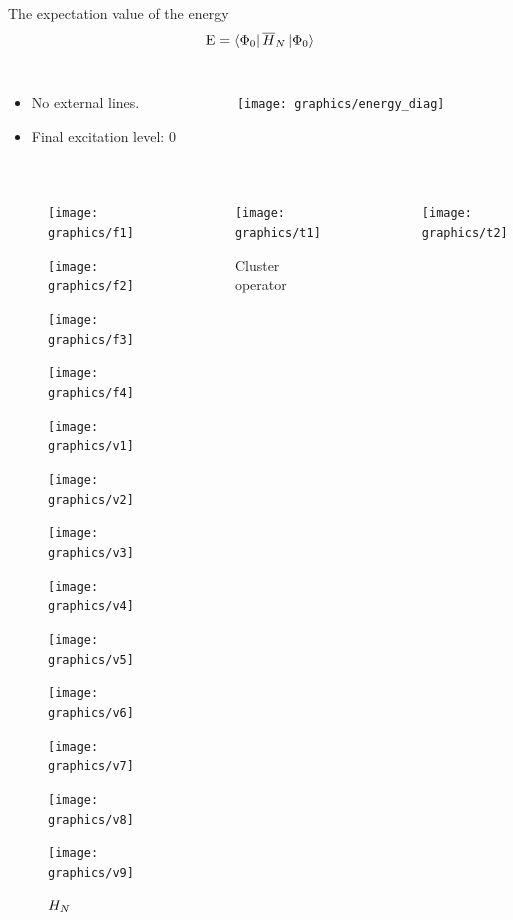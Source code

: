 \begin{frame}{The expectation value of the energy }
    \begin{equation*}
        \mathrm{E} = \bra{\Phi_0} \overline{H}_N \,|{\Phi_0}\rangle
    \end{equation*}
    \begin{columns}
    \begin{itemize}
        \item No external lines.
        \item Final excitation level: 0 
    \end{itemize}
    \begin{figure}
        \centering
        \texttt{[image: graphics/energy\_diag]}
    \end{figure}
    \end{columns}
    \renewcommand{\figurename}{Elements}
    \begin{columns}[t]
    \begin{figure}
        \caption{$H_N$}
        \centering
        \parbox{0.20\textwidth}{
            \centering
            \texttt{[image: graphics/f1]}} 
        \parbox{0.20\textwidth}{
            \centering
            \texttt{[image: graphics/f2]}} 
        \parbox{0.20\textwidth}{
            \centering
            \texttt{[image: graphics/f3]}} 
        \parbox{0.20\textwidth}{
            \centering
            \texttt{[image: graphics/f4]}} 
        \parbox{0.20\textwidth}{
            \centering
            \texttt{[image: graphics/v1]}} 
        \parbox{0.20\textwidth}{
            \centering
            \texttt{[image: graphics/v2]}} 
        \parbox{0.20\textwidth}{
            \centering
            \texttt{[image: graphics/v3]}} 
        \parbox{0.20\textwidth}{
            \centering
            \texttt{[image: graphics/v4]}} 
        \parbox{0.20\textwidth}{
            \centering
            \texttt{[image: graphics/v5]}} 
        \parbox{0.20\textwidth}{
            \centering
            \texttt{[image: graphics/v6]}} 
        \parbox{0.20\textwidth}{
            \centering
            \texttt{[image: graphics/v7]}} 
        \parbox{0.20\textwidth}{
            \centering
            \texttt{[image: graphics/v8]}} 
        \parbox{0.20\textwidth}{
            \centering
            \texttt{[image: graphics/v9]}} 
    \end{figure}
    \begin{figure}
        \caption{Cluster operator}
        \centering
        \parbox[height=3cm]{0.60\textwidth}{
            \centering
            \texttt{[image: graphics/t1]}} 
    \end{figure}
    \begin{figure}
        \parbox[height=3cm]{0.60\textwidth}{
            \centering
            \texttt{[image: graphics/t2]}} 
    \end{figure}
\end{columns}
\end{frame}
